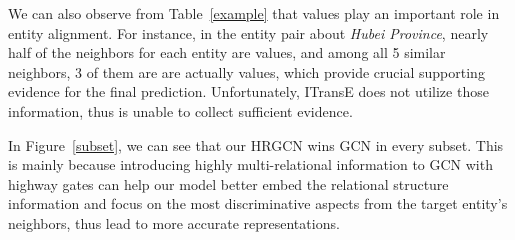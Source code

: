 	We can also observe from Table~\ref{example} that values play an important role in entity alignment.
	For instance, in the entity pair about \textit{Hubei Province}, nearly half of the neighbors for each entity are values, and among all 5 similar neighbors, 3 of them are are actually values,
	which provide crucial supporting evidence for the final prediction. Unfortunately, ITransE does not utilize those information, thus is unable to collect sufficient evidence.

	
	In Figure~\ref{subset}, we can see that our HRGCN wins GCN in every subset.
	This is mainly because introducing highly multi-relational information to GCN with highway gates can help our model better embed the relational structure information and focus on the most discriminative aspects from the target entity's neighbors, thus lead to more accurate representations.
		
	

